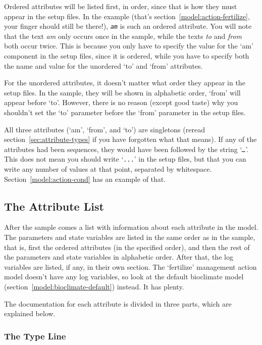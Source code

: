 Ordered attributes will be listed first, in order, since that is how
they must appear in the setup files.  In the example (that's
section~\ref{model:action-fertilize}, your finger should still be
there!), \texttt{\textit{am}} is such an ordered attribute.  You will
note that the text \emph{am} only occurs once in the sample, while the
texts \emph{to} and \emph{from} both occur twice.  This is because you
only have to specify the value for the `am' component in the setup
files, since it is ordered, while you have to specify both the name
and value for the unordered `to' and `from' attributes.

For the unordered attributes, it doesn't matter what order they appear
in the setup files.  In the sample, they will be shown in alphabetic
order, `from' will appear before `to'.  However, there is no reason
(except good taste) why you shouldn't set the `to' parameter before
the `from' parameter in the setup files.

All three attributes (`am', `from', and `to') are singletons (reread
section~\ref{sec:attribute-types} if you have forgotten what that
means).  If any of the attributes had been sequences, they would have
been followed by the string `\texttt{\textit{\ldots{}}}'.  This does
not mean you should write `\texttt{...}' in the setup files, but that
you can write any number of values at that point, separated by
whitespace.  Section~\ref{model:action-cond} has an example of that.

\subsection{The Attribute List}
\label{sec:alist-doc}

After the sample comes a list with information about each attribute in
the model.  The parameters and state variables are listed in the same
order as in the sample, that is, first the ordered attributes (in the
specified order), and then the rest of the parameters and state
variables in alphabetic order.  After that, the log variables are
listed, if any, in their own section.  The `fertilize' management
action model doesn't have any log variables, so look at the default
bioclimate model (section~\ref{model:bioclimate-default}) instead.  It
has plenty.

The documentation for each attribute is divided in three parts, which
are explained below.

\subsubsection{The Type Line}

